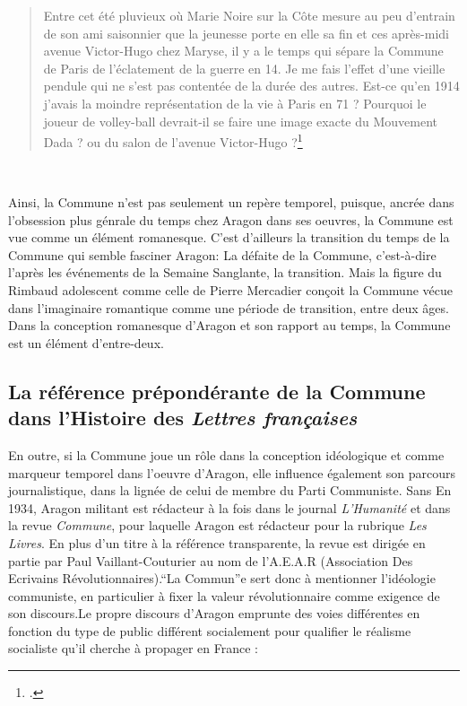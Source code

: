  \begin{quote}
Entre cet été pluvieux où Marie Noire sur la Côte mesure au peu d’entrain de son ami saisonnier que la jeunesse porte en elle sa fin et ces après-midi avenue Victor-Hugo chez Maryse, il y a le temps qui sépare la Commune de Paris de l’éclatement de la guerre en 14. Je me fais l’effet d’une vieille pendule qui ne s’est pas contentée de la durée des autres. Est-ce qu’en 1914 j’avais la moindre représentation de la vie à Paris en 71 ? Pourquoi le joueur de volley-ball devrait-il se faire une image exacte du Mouvement Dada ? ou du salon de l’avenue Victor-Hugo ?\footcite[p38]{blancheouloubli}\end{quote} 

Ainsi, la Commune n'est pas seulement un repère temporel, puisque, ancrée dans l'obsession plus génrale du temps chez Aragon dans ses oeuvres, la Commune est vue comme un élément romanesque. C'est d'ailleurs la transition du temps de la Commune qui semble fasciner Aragon: La défaite de la Commune, c'est-à-dire l'après les événements de la Semaine Sanglante, la transition. Mais la figure du Rimbaud adolescent comme celle de Pierre Mercadier conçoit la Commune vécue dans l'imaginaire romantique comme une période de transition, entre deux âges. Dans la conception romanesque d'Aragon et son rapport au temps, la Commune est un élément d'entre-deux. 
 
\subsection{La référence prépondérante de la Commune dans l'Histoire des \emph{Lettres françaises}}

En outre, si la Commune joue un rôle dans la conception idéologique et comme marqueur temporel dans l'oeuvre d'Aragon, elle influence également son parcours journalistique, dans la lignée de celui de membre du Parti Communiste. Sans En 1934, Aragon militant est rédacteur à la fois dans le journal \emph{L'Humanité} et dans la revue \emph{Commune}, pour laquelle Aragon est rédacteur pour la rubrique \emph{Les Livres}. En plus d'un titre à la référence transparente, la revue est dirigée en partie par Paul Vaillant-Couturier au nom de l'A.E.A.R (Association Des Ecrivains Révolutionnaires).\enquote{La Commun}e sert donc à mentionner l'idéologie communiste, en particulier à fixer la valeur révolutionnaire comme exigence de son discours.Le propre discours d'Aragon emprunte des voies différentes en fonction du type de public différent socialement pour qualifier le réalisme socialiste qu'il cherche à propager en France : 

